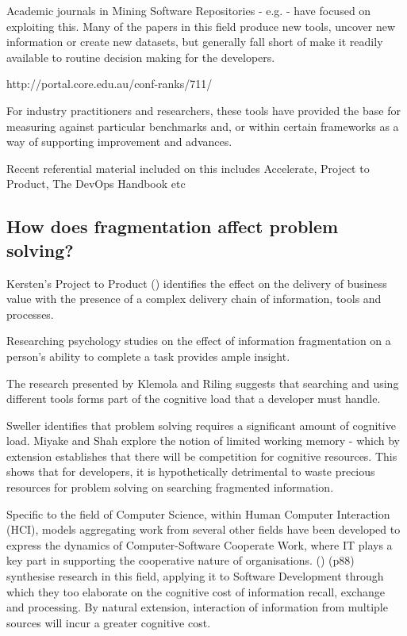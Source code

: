 Academic journals in Mining Software Repositories - e.g. \cite{Storey:2019:3341883} - have focused on exploiting this. Many of the papers in this field produce new tools, uncover new information or create new datasets, but generally fall short of make it readily available to routine decision making for the developers.


http://portal.core.edu.au/conf-ranks/711/

For industry practitioners and researchers, these tools have provided the base for measuring against particular benchmarks and, or within certain frameworks as a way of supporting improvement and advances. 


Recent referential material included on this includes Accelerate, Project to Product, The DevOps Handbook etc

\subsection{How does fragmentation affect problem solving?}


Kersten's Project to Product () identifies the effect on the delivery of business value with the presence of a complex delivery chain of information, tools and processes.


Researching psychology studies on the effect of information fragmentation on a person's ability to complete a task provides ample insight. 

The research presented by Klemola and Riling \parencite*{klemola2002modeling} suggests that searching and using different tools forms part of the cognitive load that a developer must handle.

Sweller \parencite*{sweller1998cognitive} identifies that problem solving requires a significant amount of cognitive load. Miyake and Shah \parencite*{miyake1999models} explore the notion of limited working memory - which by extension establishes that there will be competition for cognitive resources. This shows that for developers, it is hypothetically detrimental to waste precious resources for problem solving on searching fragmented information.

Specific to the field of Computer Science, within Human Computer Interaction (HCI), models aggregating work from several other fields have been developed to express the dynamics of Computer-Software Cooperate Work, where IT plays a key part in supporting the cooperative nature of organisations. \citeauthor{cscApplicationsToSoftwareDevelopment} () (p88) synthesise research in this field, applying it to Software Development through which they too elaborate on the cognitive cost of information recall, exchange and processing. By natural extension, interaction of information from multiple sources will incur a greater cognitive cost. 

